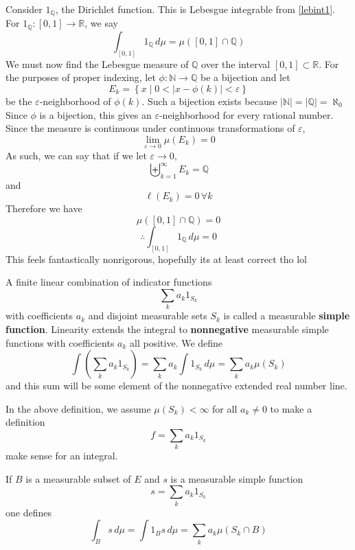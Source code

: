 \documentclass[12pt, letterpaper]{report}
\begin{document}
\begin{solution}
    Consider \(1_\mathbb{Q} \), the Dirichlet function. This is Lebesgue integrable from \ref{lebint1}. For \(1_\mathbb{Q} :[0,1]\to \mathbb{R} \), we say
    \[
        \int_{[0,1]} 1_\mathbb{Q} \,d \mu =\mu ([0,1]\cap \mathbb{Q} )
    \]
    We must now find the Lebesgue measure of \(\mathbb{Q} \) over the interval \([0,1]\subset \mathbb{R} \). For the purposes of proper indexing, let \(\phi :\mathbb{N}\to \mathbb{Q}\) be a bijection and let
    \[
        E_k = \left\{ x \mid 0<\vert x-\phi (k) \vert<\varepsilon   \right\} 
    \]
    be the \(\varepsilon \)-neighborhood of \(\phi (k)\). Such a bijection exists because \(\vert \mathbb{N} \vert =\vert \mathbb{Q} \vert=\aleph_0  \)  Since \(\phi \) is a bijection, this gives an \(\varepsilon \)-neighborhood for every rational number. Since the measure is continuous under continuous transformations of \(\varepsilon \),
    \[
        \lim_{\varepsilon  \to 0} \mu (E_k)=0
    \]
    As such, we can say that if we let \(\varepsilon \to 0\),
    \[
        \biguplus_{k=1}^\infty E_k = \mathbb{Q}
    \]
    and
    \[\ell (E_k)=0\,\forall k\]
    Therefore we have 
    \[
        \mu ([0,1]\cap \mathbb{Q})=0
    \]
    \[
        \therefore \int_{[0,1]}1_\mathbb{Q}\,d \mu =0
    \]
    This feels fantastically nonrigorous, hopefully its at least correct tho lol
\end{solution}
\begin{definition}
    A finite linear combination of indicator functions 
\[
    \sum_{k}a_k 1_{S_k}
\]
with coefficients \(a_k\) and disjoint measurable sets \(S_k\) is called a measurable \textbf{simple} \textbf{function}. Linearity extends the integral to \textbf{nonnegative} measurable simple functions with coefficients \(a_k\) all positive. We define
\[
    \int\left( \sum_{k}a_k 1_{S_k}  \right) =\sum_{k}a_k \int1_{S_k} \,d \mu =\sum_{k}a_k \mu \left( S_k \right)
\]
and this sum will be some element of the nonnegative extended real number line.
\end{definition}
In the above definition, we assume \(\mu \left( S_k \right)<\infty \) for all \(a_k \neq 0\) to make a definition
\[
    f=\sum_{k}a_k 1_{S_k} 
\]
make sense for an integral.
\begin{definition}
    If \(B\) is a measurable subset of \(E\) and \(s\) is a measurable simple function
    \[
        s=\sum_{k}a_k 1_{S_k} 
    \]
    one defines
    \[
        \int_B s\,d \mu =\int 1_B s\,d \mu =\sum_{k}a_k \mu \left( S_k \cap B \right)
    \]
\end{definition}
\end{document}
